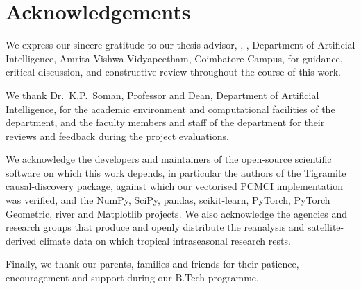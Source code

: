 \chapter*{Acknowledgements}

We express our sincere gratitude to our thesis advisor, \AdvisorName, \AdvisorDesignation, Department of Artificial Intelligence, Amrita Vishwa Vidyapeetham, Coimbatore Campus, for guidance, critical discussion, and constructive review throughout the course of this work. 

We thank Dr.~K.P.~Soman, Professor and Dean, Department of Artificial Intelligence, for the academic environment and computational facilities of the department, and the faculty members and staff of the department for their reviews and feedback during the project evaluations.

We acknowledge the developers and maintainers of the open-source scientific software on which this work depends, in particular the authors of the Tigramite causal-discovery package, against which our vectorised PCMCI implementation was verified, and the NumPy, SciPy, pandas, scikit-learn, PyTorch, PyTorch Geometric, river and Matplotlib projects. We also acknowledge the agencies and research groups that produce and openly distribute the reanalysis and satellite-derived climate data on which tropical intraseasonal research rests.

Finally, we thank our parents, families and friends for their patience, encouragement and support during our B.Tech programme.

\vspace{1cm}
\begin{flushright}
	\MakeUppercase{\StudentA}\\
	\MakeUppercase{\StudentB}\\
	\MakeUppercase{\StudentC}\\
	\MakeUppercase{\StudentD}
\end{flushright}
